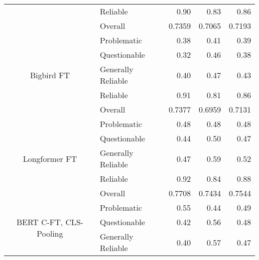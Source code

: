 \begin{table}[htbp]
\begin{longtable}{| c | l | r | r | r |}
                                                          & Reliable           & 0.90               & 0.83            & 0.86            \\\cline{2-5}
                                                          & Overall            & 0.7359             & 0.7065          & 0.7193          \\
        \hline
        \multirow{5}{*}{Bigbird FT}                       & Problematic        & 0.38               & 0.41            & 0.39            \\
                                                          & Questionable       & 0.32               & 0.46            & 0.38            \\
                                                          & Generally Reliable & 0.40               & 0.47            & 0.43            \\
                                                          & Reliable           & 0.91               & 0.81            & 0.86            \\\cline{2-5}
                                                          & Overall            & 0.7377             & 0.6959          & 0.7131          \\
        \hline
        \multirow{5}{*}{Longformer FT}                    & Problematic        & 0.48               & 0.48            & 0.48            \\
                                                          & Questionable       & 0.44               & 0.50            & 0.47            \\
                                                          & Generally Reliable & 0.47               & 0.59            & 0.52            \\
                                                          & Reliable           & 0.92               & 0.84            & 0.88            \\\cline{2-5}
                                                          & Overall            & 0.7708             & 0.7434          & 0.7544          \\
        \hline
        \multirow{5}{*}{BERT C-FT, CLS-Pooling}           & Problematic        & 0.55               & 0.44            & 0.49            \\
                                                          & Questionable       & 0.42               & 0.56            & 0.48            \\
                                                          & Generally Reliable & 0.40               & 0.57            & 0.47            \\

\end{longtable}
\end{table}
